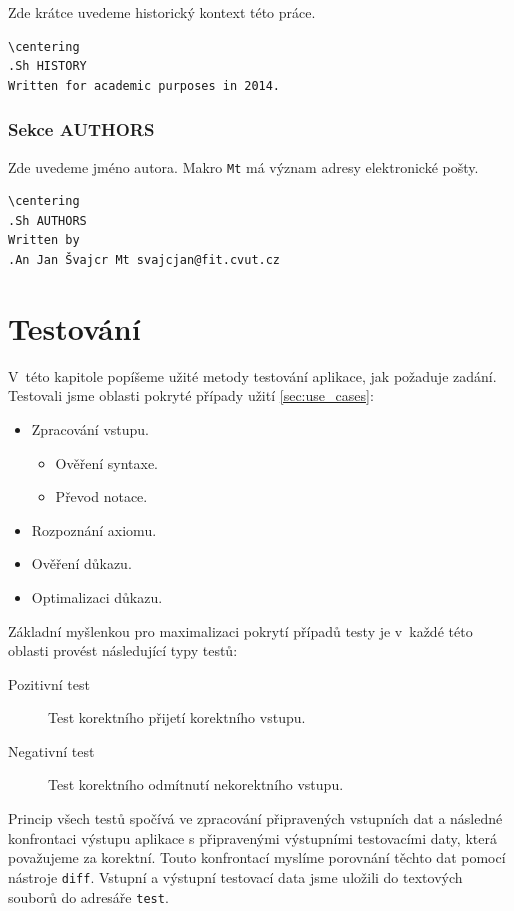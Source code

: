 \documentclass[thesis=B,czech,hidelinks]{thesis}[2012/06/26]
\begin{document}
Zde krátce uvedeme historický kontext této práce.

\begin{verbatim}
\centering
.Sh HISTORY
Written for academic purposes in 2014.
\end{verbatim}

\subsection{Sekce AUTHORS}

Zde uvedeme jméno autora. Makro \texttt{Mt} má význam adresy elektronické pošty.

\begin{verbatim}
\centering
.Sh AUTHORS
Written by
.An Jan Švajcr Mt svajcjan@fit.cvut.cz
\end{verbatim}

%
%
%

\chapter{Testování}

V~této kapitole popíšeme užité metody testování aplikace, jak požaduje zadání. Testovali jsme oblasti pokryté případy užití \ref{sec:use_cases}:

\begin{itemize}
	\item Zpracování vstupu.
	\begin{itemize}
		\item Ověření syntaxe.
		\item Převod notace.
	\end{itemize}
	\item Rozpoznání axiomu.
	\item Ověření důkazu.
	\item Optimalizaci důkazu.
\end{itemize}

Základní myšlenkou pro maximalizaci pokrytí případů testy je v~každé této oblasti provést následující typy testů:

\begin{description}
	\item[Pozitivní test] Test korektního přijetí korektního vstupu.
	\item[Negativní test] Test korektního odmítnutí nekorektního vstupu.
\end{description}

Princip všech testů spočívá ve zpracování připravených vstupních dat a následné konfrontaci výstupu aplikace s připravenými výstupními testovacími daty, která považujeme za korektní. Touto konfrontací myslíme porovnání těchto dat pomocí nástroje \texttt{diff}. Vstupní a výstupní testovací data jsme uložili do textových souborů do adresáře \texttt{test}.
\end{document}

